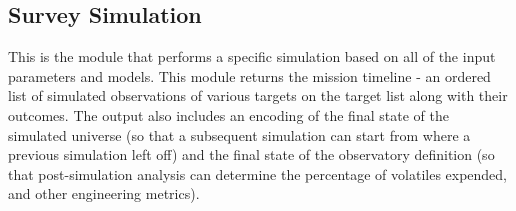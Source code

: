 \documentclass[cleanfoot]{asme2ej}
\begin{document}
%

%


\subsection{Survey Simulation} \label{sec:surveysim}
This is the module that performs a specific simulation based on all of the input parameters and models. This module returns the mission timeline - an ordered list of simulated observations of various targets on the target list along with their outcomes.  The output also includes an encoding of the final state of the simulated universe (so that a subsequent simulation can start from where a previous simulation left off) and the final state of the observatory definition (so that post-simulation analysis can determine the percentage of volatiles expended, and other engineering metrics).
\end{document}
